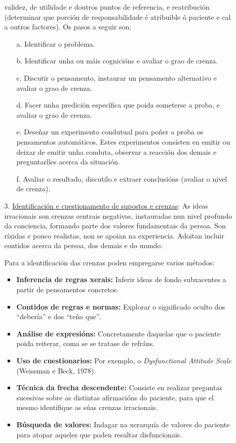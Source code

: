 \documentclass[a4paper,11pt]{article}
\begin{document}
\begin{itemize}
\begin{itemize}
		validez, de utilidade e doutros puntos de referencia, e reatribución (determinar que porción 
		de responsabilidade é atribuible ó paciente e cal a outros factores). Os pasos a seguir son:
		\begin{itemize}
			\item[a.] Identificar o problema.
			\item[b.] Identificar unha ou máis cognicións e avaliar o grao de crenza.
			\item[c.] Discutir o pensamento, instaurar un pensamento alternativo e avaliar o grao de 
			crenza.
			\item[d.] Facer unha predición específica que poida someterse a proba, e avaliar o grao 
			de crenza.
			\item[e.] Deseñar un experimento condutual para poñer a proba os pensamentos automáticos. 
			Estes experimentos consisten en emitir ou deixar de emitir unha conduta, observar a 
			reacción dos demais e preguntarlles acerca da situación.
			\item[f.] Avaliar o resultado, discutilo e extraer conclusións (avaliar o nivel de 
			crenza). 
		\end{itemize}
		\item[3.] \underline{Identificación e cuestionamento de supostos e crenzas}: As ideas 
		irracionais son crenzas centrais negativas, instauradas nun nivel profundo da conciencia, 
		formando parte dos valores fundamentais da persoa. Son ríxidas e pouco realistas, non se 
		apoian na experiencia. Adoitan incluir contidos acerca da persoa, dos demais e do mundo. 
		
		Para a identificación das crenzas poden empregarse varios métodos:
		\begin{itemize}
			\item \textbf{Inferencia de regras xerais:} Inferir ideas de fondo subxacentes a partir 
			de pensamentos concretos.
			\item \textbf{Contidos de regras e normas:} Explorar o significado oculto dos ``debería'' 
			e dos ``teño que''.
			\item \textbf{Análise de expresións:} Concretamente daquelas que o paciente poida 
			reiterar, coma se se tratase de refráns.
			\item \textbf{Uso de cuestionarios:} Por exemplo, o \textit{Dysfunctional Attitude Scale} 
			(Weissman e Beck, 1978).
			\item \textbf{Técnica da frecha descendente:} Consiste en realizar preguntas sucesivas 
			sobre as distintas afirmacións do paciente, para que el mesmo identifique as súas crenzas 
			irracionais.
			\item \textbf{Búsqueda de valores:} Indagar na xerarquía de valores do paciente para 
			atopar aqueles que poden resultar disfuncionais.
		\end{itemize}
		

\end{itemize}
\end{itemize}
\end{document}
